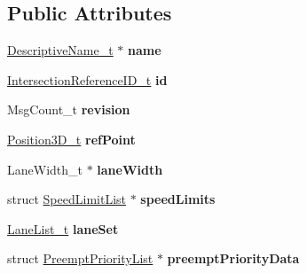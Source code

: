 \subsection*{Public Attributes}
\begin{DoxyCompactItemize}
\item 
\hyperlink{structOCTET__STRING}{Descriptive\+Name\+\_\+t} $\ast$ {\bfseries name}\hypertarget{structIntersectionGeometry_a3a59531da97a7ef72b85ebe0860c132d}{}\label{structIntersectionGeometry_a3a59531da97a7ef72b85ebe0860c132d}

\item 
\hyperlink{structIntersectionReferenceID}{Intersection\+Reference\+I\+D\+\_\+t} {\bfseries id}\hypertarget{structIntersectionGeometry_aae2662ccbe4daefa7f83cff37dad66bf}{}\label{structIntersectionGeometry_aae2662ccbe4daefa7f83cff37dad66bf}

\item 
Msg\+Count\+\_\+t {\bfseries revision}\hypertarget{structIntersectionGeometry_ad17904b061a8230ce6d9bdccfdf81e1b}{}\label{structIntersectionGeometry_ad17904b061a8230ce6d9bdccfdf81e1b}

\item 
\hyperlink{structPosition3D}{Position3\+D\+\_\+t} {\bfseries ref\+Point}\hypertarget{structIntersectionGeometry_a3ce4e886cf87a7bc63900b652c771c1c}{}\label{structIntersectionGeometry_a3ce4e886cf87a7bc63900b652c771c1c}

\item 
Lane\+Width\+\_\+t $\ast$ {\bfseries lane\+Width}\hypertarget{structIntersectionGeometry_a2d93c3061a534bc06fb26b90823eed84}{}\label{structIntersectionGeometry_a2d93c3061a534bc06fb26b90823eed84}

\item 
struct \hyperlink{structSpeedLimitList}{Speed\+Limit\+List} $\ast$ {\bfseries speed\+Limits}\hypertarget{structIntersectionGeometry_a4a19ef02a2e863d34c1abaeb1bf55cd2}{}\label{structIntersectionGeometry_a4a19ef02a2e863d34c1abaeb1bf55cd2}

\item 
\hyperlink{structLaneList}{Lane\+List\+\_\+t} {\bfseries lane\+Set}\hypertarget{structIntersectionGeometry_a2bc1b7367c90e8eec3e1ca97e8be0d80}{}\label{structIntersectionGeometry_a2bc1b7367c90e8eec3e1ca97e8be0d80}

\item 
struct \hyperlink{structPreemptPriorityList}{Preempt\+Priority\+List} $\ast$ {\bfseries preempt\+Priority\+Data}\hypertarget{structIntersectionGeometry_a037219b9141f492dc303d689d49f3523}{}\label{structIntersectionGeometry_a037219b9141f492dc303d689d49f3523}


\end{DoxyCompactItemize}
